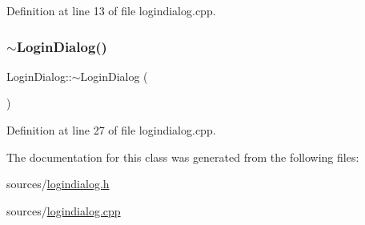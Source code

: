 Definition at line 13 of file logindialog.\+cpp.

\mbox{\label{class_login_dialog_aa5d012ebc424713ca0cbd82be1f81133}} 
\subsubsection{\texorpdfstring{$\sim$\+Login\+Dialog()}{~LoginDialog()}}
{\footnotesize\ttfamily Login\+Dialog\+::$\sim$\+Login\+Dialog (\begin{DoxyParamCaption}{ }\end{DoxyParamCaption})}



Definition at line 27 of file logindialog.\+cpp.



The documentation for this class was generated from the following files\+:\begin{DoxyCompactItemize}
\item 
sources/\mbox{\hyperlink{logindialog_8h}{logindialog.\+h}}\item 
sources/\mbox{\hyperlink{logindialog_8cpp}{logindialog.\+cpp}}\end{DoxyCompactItemize}
